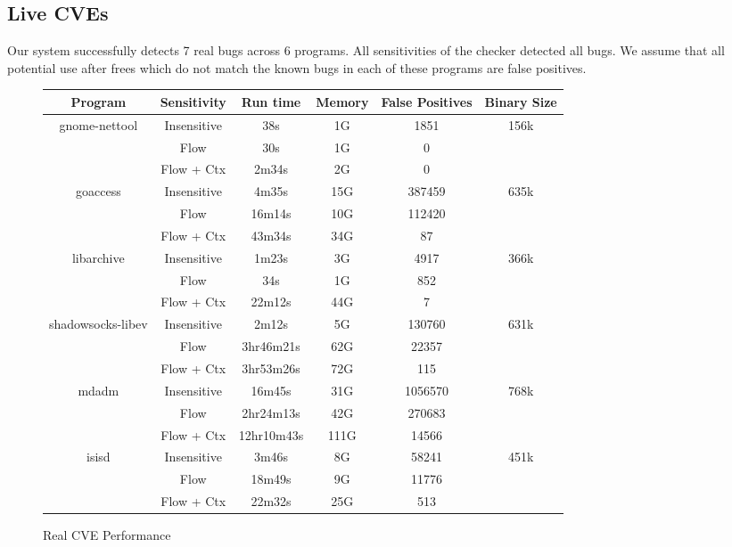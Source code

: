 \subsection{Live CVEs}
\label{alias:sec:eval:real}
Our system successfully detects 7 real bugs across 6 programs.
All sensitivities of the checker detected all bugs.
We assume that all potential use after frees which do not match the known bugs in each of these programs are false positives.

\begin{figure*}
\begin{center}
\begin{tabular}{|c|c||c|c|c|c|}
\hline
Program & Sensitivity & Run time & Memory & False Positives & Binary Size\\
\hline \hline
\multirow{3}{*}{gnome-nettool} & Insensitive & 38s & 1G & 1851 & \multirow{3}{*}{156k}\\
	& Flow & 30s & 1G & 0 &\\
	& Flow + Ctx & 2m34s & 2G & 0 &\\
	\hline
\multirow{3}{*}{goaccess} & Insensitive & 4m35s & 15G & 387459 & \multirow{3}{*}{635k}\\
	& Flow & 16m14s & 10G & 112420 &\\
	& Flow + Ctx & 43m34s & 34G & 87 &\\
	\hline
\multirow{3}{*}{libarchive} & Insensitive & 1m23s & 3G & 4917 & \multirow{3}{*}{366k}\\
	& Flow & 34s & 1G & 852 &\\
	& Flow + Ctx & 22m12s & 44G & 7 &\\
	\hline
\multirow{3}{*}{shadowsocks-libev} & Insensitive & 2m12s & 5G & 130760 & \multirow{3}{*}{631k}\\
	& Flow & 3hr46m21s & 62G & 22357 &\\
	& Flow + Ctx & 3hr53m26s & 72G & 115 &\\
	\hline
\multirow{3}{*}{mdadm} & Insensitive & 16m45s & 31G & 1056570 & \multirow{3}{*}{768k}\\
	& Flow & 2hr24m13s & 42G & 270683 &\\
	& Flow + Ctx & 12hr10m43s & 111G & 14566 &\\
	\hline
\multirow{3}{*}{isisd} & Insensitive & 3m46s & 8G & 58241 & \multirow{3}{*}{451k}\\
	& Flow & 18m49s & 9G & 11776 &\\
	& Flow + Ctx & 22m32s & 25G & 513 &\\
	\hline
\end{tabular}
\end{center}
\caption{Real CVE Performance}
\label{fig:cveperf}
\end{figure*}

